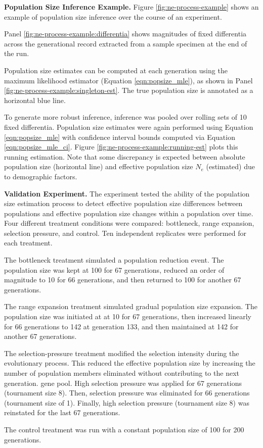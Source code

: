
\textbf{Population Size Inference Example.}
Figure \ref{fig:ne-process-example} shows an example of population size inference over the course of an experiment.

Panel \ref{fig:ne-process-example:differentia} shows magnitudes of fixed differentia across the generational record extracted from a sample specimen at the end of the run.

Population size estimates can be computed at each generation using the maximum likelihood estimator (Equation \ref{eqn:popsize_mle}), as shown in Panel \ref{fig:ne-process-example:singleton-est}.
The true population size is annotated as a horizontal blue line.

To generate more robust inference, inference was pooled over rolling sets of 10 fixed differentia.
Population size estimates were again performed using Equation \ref{eqn:popsize_mle} with confidence interval bounds computed via Equation \ref{eqn:popsize_mle_ci}.
Figure \ref{fig:ne-process-example:running-est} plots this running estimation.
Note that some discrepancy is expected between absolute population size (horizontal line) and effective population size $N_e$ (estimated) due to demographic factors.

\textbf{Validation Experiment.}
The experiment tested the ability of the population size estimation process to detect effective population size differences between populations and effective population size changes within a population over time.
Four different treatment conditions were compared: bottleneck, range expansion, selection pressure, and control.
Ten independent replicates were performed for each treatment.

The bottleneck treatment simulated a population reduction event.
The population size was kept at 100 for 67 generations, reduced an order of magnitude to 10 for 66 generations, and then returned to 100 for another 67 generations.

The range expansion treatment simulated gradual population size expansion.
The population size was initiated at at 10 for 67 generations, then increased linearly for 66 generations to 142 at generation 133, and then maintained at 142 for another 67 generations.

The selection-pressure treatment modified the selection intensity during the evolutionary process.
This reduced the effective population size by increasing the number of population members eliminated without contributing to the next generation. gene pool.
High selection pressure was applied for 67 generations (tournament size 8). Then, selection pressure was eliminated for 66 generations (tournament size of 1).
Finally, high selection pressure (tournament size 8) was reinstated for the last 67 generations.

The control treatment was run with a constant population size of 100 for 200 generations.
